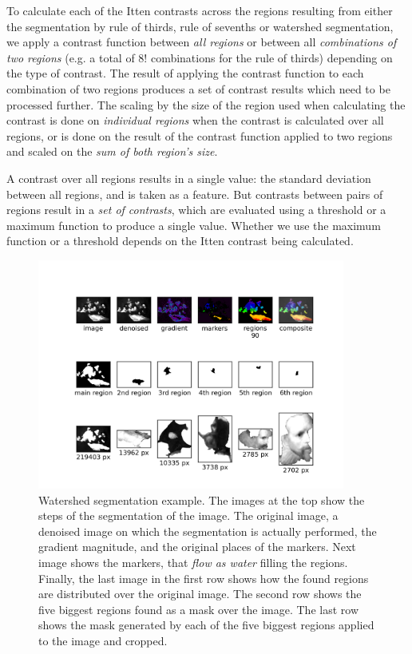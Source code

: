 \documentclass[11pt,a4paper,twoside,openright]{report}
\begin{document}
To calculate each of the Itten contrasts across the regions resulting from
either the segmentation by rule of thirds, rule of sevenths or watershed
segmentation, we apply a contrast function between \emph{all regions} or
between all \emph{combinations of two regions} (e.g. a total of $8!$
combinations for the rule of thirds) depending on the type of contrast.  The
result of applying the contrast function to each combination of two regions
produces a set of contrast results which need to be processed further.  The
scaling by the size of the region used when calculating the contrast is done on
\emph{individual regions} when the contrast is calculated over all regions, or
is done on the result of the contrast function applied to two regions and
scaled on the \emph{sum of both region's size}.

A contrast over all regions results in a single value: the standard deviation
between all regions, and is taken as a feature.  But contrasts between pairs of
regions result in a \emph{set of contrasts}, which are evaluated using a
threshold or a maximum function to produce a single value.  Whether we use the
maximum function or a threshold depends on the Itten contrast being calculated.

\begin{figure}
\centering
\includegraphics[width=0.9\textwidth]{segm_rembrandt_eu_464}
\caption[Watershed segmentation example]{Watershed segmentation example.  The
images at the top show the steps of the segmentation of the image.  The
original image, a denoised image on which the segmentation is actually
performed, the gradient magnitude, and the original places of the markers.
Next image shows the markers, that \emph{flow as water} filling the regions.
Finally, the last image in the first row shows how the found regions are
distributed over the original image.  The second row shows the five biggest
regions found as a mask over the image.  The last row shows the mask generated
by each of the five biggest regions applied to the image and cropped.}
\label{fig:segm}
\end{figure}
\end{document}
